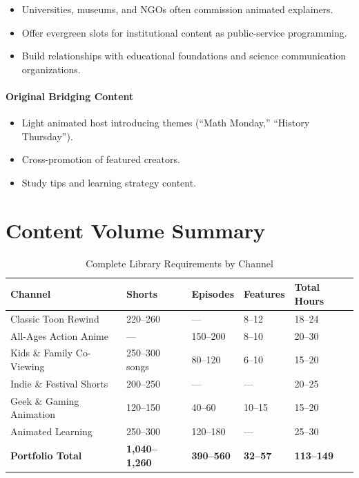 \documentclass[12pt,letterpaper,twoside]{report}
\begin{document}
\begin{itemize}[leftmargin=1.5cm]
    \item Universities, museums, and NGOs often commission animated explainers.
    \item Offer evergreen slots for institutional content as public-service programming.
    \item Build relationships with educational foundations and science communication organizations.
\end{itemize}

\subsubsection{Original Bridging Content}

\begin{itemize}[leftmargin=1.5cm]
    \item Light animated host introducing themes (``Math Monday,'' ``History Thursday'').
    \item Cross-promotion of featured creators.
    \item Study tips and learning strategy content.
\end{itemize}

\appendix

\chapter{Content Volume Summary}
\label{app:volume-summary}

\begin{table}[H]
\centering
\caption{Complete Library Requirements by Channel}
\label{tab:complete-library}
\begin{tabular}{@{}L{4cm}R{2cm}R{2cm}R{2cm}R{2cm}@{}}
\toprule
\textbf{Channel} & \textbf{Shorts} & \textbf{Episodes} & \textbf{Features} & \textbf{Total Hours} \\
\midrule
Classic Toon Rewind & 220--260 & --- & 8--12 & 18--24 \\
All-Ages Action Anime & --- & 150--200 & 8--10 & 20--30 \\
Kids \& Family Co-Viewing & 250--300 songs & 80--120 & 6--10 & 15--20 \\
Indie \& Festival Shorts & 200--250 & --- & --- & 20--25 \\
Geek \& Gaming Animation & 120--150 & 40--60 & 10--15 & 15--20 \\
Animated Learning & 250--300 & 120--180 & --- & 25--30 \\
\midrule
\textbf{Portfolio Total} & \textbf{1,040--1,260} & \textbf{390--560} & \textbf{32--57} & \textbf{113--149} \\
\bottomrule
\end{tabular}
\end{table}
\end{document}
